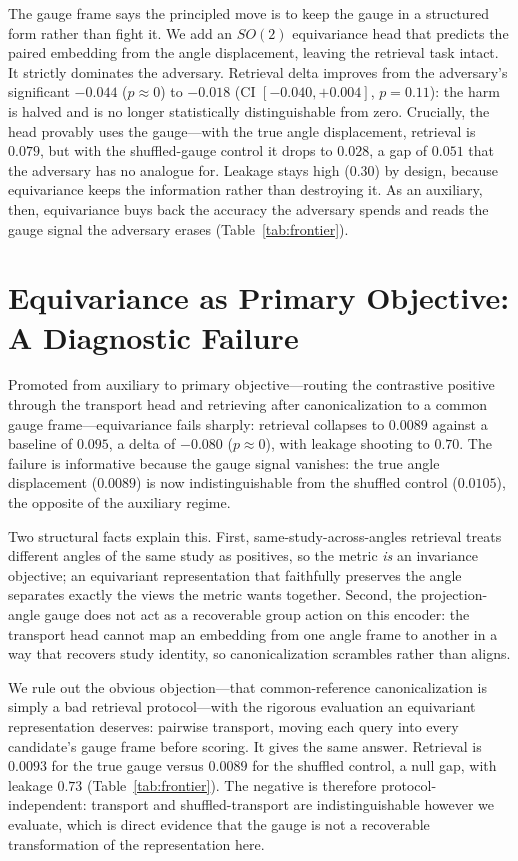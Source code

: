 \documentclass[11pt]{article}
\begin{document}
The gauge frame says the principled move is to keep the gauge in a structured form rather than fight
it. We add an $SO(2)$ equivariance head that predicts the paired embedding from the angle
displacement, leaving the retrieval task intact. It strictly dominates the adversary. Retrieval
delta improves from the adversary's significant $-0.044$ ($p\approx0$) to $-0.018$ (CI
$[-0.040,+0.004]$, $p=0.11$): the harm is halved and is no longer statistically distinguishable from
zero. Crucially, the head provably uses the gauge---with the true angle displacement, retrieval is
$0.079$, but with the shuffled-gauge control it drops to $0.028$, a gap of $0.051$ that the adversary
has no analogue for. Leakage stays high ($0.30$) by design, because equivariance keeps the
information rather than destroying it. As an auxiliary, then, equivariance buys back the accuracy the
adversary spends and reads the gauge signal the adversary erases (Table~\ref{tab:frontier}).

\section{Equivariance as Primary Objective: A Diagnostic Failure}\label{sec:primary}

Promoted from auxiliary to primary objective---routing the contrastive positive through the
transport head and retrieving after canonicalization to a common gauge frame---equivariance fails
sharply: retrieval collapses to $0.0089$ against a baseline of $0.095$, a delta of $-0.080$ ($p\approx0$),
with leakage shooting to $0.70$. The failure is informative because the gauge signal vanishes: the
true angle displacement ($0.0089$) is now indistinguishable from the shuffled control ($0.0105$),
the opposite of the auxiliary regime.

Two structural facts explain this. First, same-study-across-angles retrieval treats different angles
of the same study as positives, so the metric \emph{is} an invariance objective; an equivariant
representation that faithfully preserves the angle separates exactly the views the metric wants
together. Second, the projection-angle gauge does not act as a recoverable group action on this
encoder: the transport head cannot map an embedding from one angle frame to another in a way that
recovers study identity, so canonicalization scrambles rather than aligns.

We rule out the obvious objection---that common-reference canonicalization is simply a bad
retrieval protocol---with the rigorous evaluation an equivariant representation deserves: pairwise
transport, moving each query into every candidate's gauge frame before scoring. It gives the same
answer. Retrieval is $0.0093$ for the true gauge versus $0.0089$ for the shuffled control, a null
gap, with leakage $0.73$ (Table~\ref{tab:frontier}). The negative is therefore protocol-independent:
transport and shuffled-transport are indistinguishable however we evaluate, which is direct evidence
that the gauge is not a recoverable transformation of the representation here.
\end{document}
